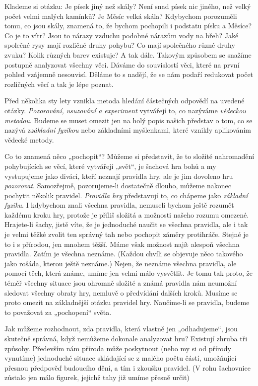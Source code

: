 {    Klademe si otázku: Je písek jiný než skály? Není snad písek nic jiného, než velký počet velmi 
    malých kamínků? Je Měsíc velká skála? Kdybychom porozuměli tomu, co jsou skály, znamená to, že 
    bychom pochopili i podstatu písku a Měsíce? Co je to vítr? Jsou to nárazy vzduchu podobné 
    nárazům vody na břeh? Jaké společné rysy mají rozličné druhy pohybu? Co mají společného různé 
    druhy zvuku? Kolik různých barev existuje? A tak dále. Takovým způsobem se snažíme postupně 
    analyzovat všechny věci. Dáváme do souvislostí věci, které na první pohled vzájemně nesouvisí. 
    Děláme to s nadějí, že se nám podaří redukovat počet rozličných věcí a tak je lépe poznat.
    
    Před několika sty lety vznikla metoda hledání částečných odpovědí na uvedené otázky. 
    \emph{Pozorování, usuzování a experiment} vytvářejí to, co nazýváme \emph{vědeckou metodou}. 
    Budeme se muset omezit jen na holý popis našich představ o tom, co se nazývá z\emph{základní 
    fyzikou} nebo základními myšlenkami, které vznikly aplikováním vědecké metody.
    
    Co to znamená něco „pochopit“? Můžeme si představit, že to složité nahromadění pohybujících se 
    věcí, které vytvářejí „svět“, je šachová hra bohů a my vystupujeme jako diváci, kteří neznají 
    pravidla hry, ale je jim dovoleno hru \emph{pozorovat}. Samozřejmě, pozorujeme-li dostatečně 
    dlouho, můžeme nakonec pochytit několik pravidel. \emph{Pravidla hry} představují to, co 
    chápeme jako \emph{základní fyziku}. I  kdybychom znali všechna pravidla, nemuseli bychom ještě 
    rozumět každému kroku hry, protože je příliš složitá a možnosti našeho rozumu omezené. 
    Hrajete-li šachy, jistě víte, že je jednoduché naučit se všechna pravidla, ale i tak je velmi 
    těžké zvolit ten správný tah nebo pochopit záměry protihráče. Stejné je to i s přírodou, jen 
    mnohem těžší. Máme však možnost najít alespoň všechna pravidla. Zatím je všechna neznáme. 
    (Každou chvíli se objevuje něco takového jako rošáda, kterou ještě neznáme.) Nejen, že neznáme 
    všechna pravidla, ale pomocí těch, která známe, umíme jen velmi málo vysvětlit. Je tomu tak 
    proto, že téměř všechny situace jsou ohromně složité a známá pravidla nám neumožní sledovat 
    všechny obraty hry, nemluvě o předvídání dalších kroků. Musíme se proto omezit na základnější 
    otázku pravidel hry. Naučíme-li se pravidla, budeme to považovat za „pochopení“ světa.
    
    Jak můžeme rozhodnout, zda pravidla, která vlastně jen „odhadujeme“, jsou skutečně správná, 
    když nemůžeme dokonale analyzovat hru? Existují zhruba tři způsoby. Především nám příroda může 
    poskytnout (nebo my si od přírody vynutíme) jednoduché situace skládající se z malého počtu 
    částí, umožňující přesnou předpověď budoucího dění, a tím i zkoušku pravidel. (V rohu 
    šachovnice zůstalo jen málo figurek, jejichž tahy již umíme přesně určit)
    
}
